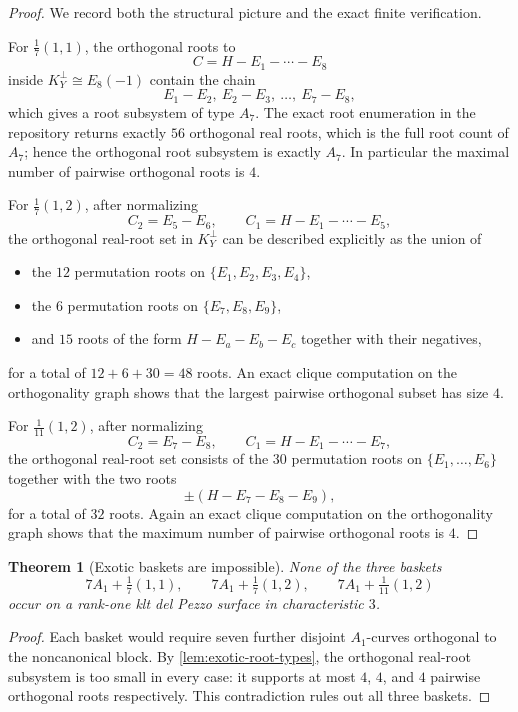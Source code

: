 \documentclass[11pt]{article}
\newtheorem{theorem}{Theorem}[section]
\theoremstyle{definition}
\begin{document}
\begin{proof}
We record both the structural picture and the exact finite verification.

For $\frac17(1,1)$, the orthogonal roots to
\[
C=H-E_1-\cdots-E_8
\]
inside $K_Y^{\perp}\cong E_8(-1)$ contain the chain
\[
E_1-E_2,\ E_2-E_3,\ \dots,\ E_7-E_8,
\]
which gives a root subsystem of type $A_7$. The exact root enumeration in the repository returns exactly $56$ orthogonal real roots, which is the full root count of $A_7$; hence the orthogonal root subsystem is exactly $A_7$. In particular the maximal number of pairwise orthogonal roots is $4$.

For $\frac17(1,2)$, after normalizing
\[
C_2=E_5-E_6,\qquad C_1=H-E_1-\cdots-E_5,
\]
the orthogonal real-root set in $K_Y^{\perp}$ can be described explicitly as the union of
\begin{itemize}[leftmargin=2.5em]
    \item the $12$ permutation roots on $\{E_1,E_2,E_3,E_4\}$,
    \item the $6$ permutation roots on $\{E_7,E_8,E_9\}$,
    \item and $15$ roots of the form $H-E_a-E_b-E_c$ together with their negatives,
\end{itemize}
for a total of $12+6+30=48$ roots. An exact clique computation on the orthogonality graph shows that the largest pairwise orthogonal subset has size $4$.

For $\frac1{11}(1,2)$, after normalizing
\[
C_2=E_7-E_8,\qquad C_1=H-E_1-\cdots-E_7,
\]
the orthogonal real-root set consists of the $30$ permutation roots on $\{E_1,\dots,E_6\}$ together with the two roots
\[
\pm(H-E_7-E_8-E_9),
\]
for a total of $32$ roots. Again an exact clique computation on the orthogonality graph shows that the maximum number of pairwise orthogonal roots is $4$.
\end{proof}

\begin{theorem}[Exotic baskets are impossible]\label{thm:exotic}
None of the three baskets
\[
7A_1+\tfrac17(1,1),\qquad 7A_1+\tfrac17(1,2),\qquad 7A_1+\tfrac1{11}(1,2)
\]
occur on a rank-one klt del Pezzo surface in characteristic $3$.
\end{theorem}

\begin{proof}
Each basket would require seven further disjoint $A_1$-curves orthogonal to the noncanonical block. By \cref{lem:exotic-root-types}, the orthogonal real-root subsystem is too small in every case: it supports at most $4$, $4$, and $4$ pairwise orthogonal roots respectively. This contradiction rules out all three baskets.
\end{proof}
\end{document}

